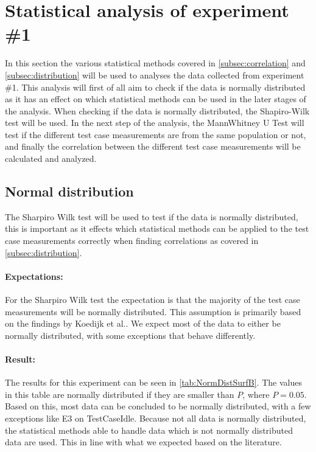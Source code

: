 \section{Statistical analysis of experiment \#1}\label{sec:Stat1}

In this section the various statistical methods covered in \cref{subsec:correlation} and \cref{subsec:distribution} will be used to analyses the data collected from experiment \#1. This analysis will first of all aim to check if the data is normally distributed as it has an effect on which statistical methods can be used in the later stages of the analysis. When checking if the data is normally distributed, the Shapiro-Wilk test will be used. In the next step of the analysis, the MannWhitney U Test will test if the different test case measurements are from the same population or not, and finally the correlation between the different test case measurements will be calculated and analyzed.

\subsection{Normal distribution}\label{subsec:NormalDist1}
The Sharpiro Wilk test will be used to test if the data is normally distributed, this is important as it effects which statistical methods can be applied to the test case measurements correctly when finding correlations as covered in \cref{subsec:distribution}. 

\paragraph{Expectations:} For the Sharpiro Wilk test the expectation is that the majority of the test case measurements will be normally distributed. This assumption is primarily based on the findings by Koedijk et al.\cite{Koedijk2022diff}. We expect most of the data to either be normally distributed, with some exceptions that behave differently.

\paragraph{Result:} The results for this experiment can be seen in \cref{tab:NormDistSurfB}. The values in this table are normally distributed if they are smaller than $P$, where $P = 0.05$. Based on this, most data can be concluded to be normally distributed, with a few exceptions like E3 on TestCaseIdle. Because not all data is normally distributed, the statistical methods able to handle data which is not normally distributed data are used. This in line with what we expected based on the literature.

